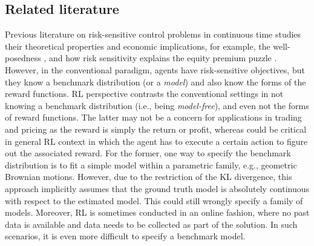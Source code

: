 \subsection*{Related literature}


Previous literature on risk-sensitive control problems in continuous time studies their theoretical properties and economic implications, for example, the well-posedness \citep{fleming1995risk,nagai1996bellman,dupuis2000robust,fleming2002risk,menaldi2005remarks}, and how risk sensitivity explains the equity premium puzzle \citep{maenhout2004robust,glasserman2013robust}. However, in the conventional paradigm, agents have risk-sensitive objectives, but they know a benchmark distribution (or a \textit{model}) and also know the forms of the reward functions. RL perspective contrasts the conventional settings in not knowing a benchmark distribution (i.e., being \textit{model-free}), and even not the forms of reward functions. The latter may not be a concern for applications in trading and pricing as the reward is simply the return or profit, whereas could be critical in general RL context in which the agent has to execute a certain action to figure out the associated reward. For the former, one way to specify the benchmark distribution is to fit a simple model within a parametric family, e.g., geometric Brownian motions. However, due to the restriction of the KL divergence, this approach implicitly assumes that the ground truth model is absolutely continuous with respect to the estimated model. This could still wrongly specify a family of models. Moreover, RL is sometimes conducted in an online fashion, where no past data is available and data needs to be collected as part of the solution. In such scenarios, it is even more difficult to specify a benchmark model. 

